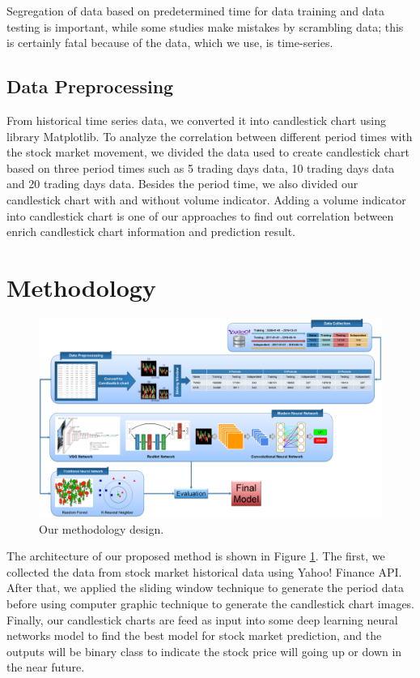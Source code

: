 \documentclass[12pt]{article}
\begin{document}
Segregation of data based on predetermined time for data training and data testing is important, while some studies make mistakes by scrambling data; this is certainly fatal because of the data, which we use, is time-series.
\subsection{Data Preprocessing}
From historical time series data, we converted it into candlestick chart using library Matplotlib\cite{hunter2007matplotlib}. To analyze the correlation between different period times with the stock market movement, we divided the data used to create candlestick chart based on three period times such as 5 trading days data, 10 trading days data and 20 trading days data. Besides the period time, we also divided our candlestick chart with and without volume indicator. Adding a volume indicator into candlestick chart is one of our approaches to find out correlation between enrich candlestick chart information and prediction result.
\section{Methodology}
\begin{figure}
\centering
  \includegraphics[width=\columnwidth]{figures/methodology.png}
  \caption{Our methodology design.}
  \label{fig:methodologydesign}
\end{figure}
The architecture of our proposed method is shown in Figure \ref{fig:methodologydesign}. The first, we collected the data from stock market historical data using Yahoo! Finance API. After that, we applied the sliding window technique to generate the period data before using computer graphic technique to generate the candlestick chart images. Finally, our candlestick charts are feed as input into some deep learning neural networks model to find the best model for stock market prediction, and the outputs will be binary class to indicate the stock price will going up or down in the near future.
\end{document}
